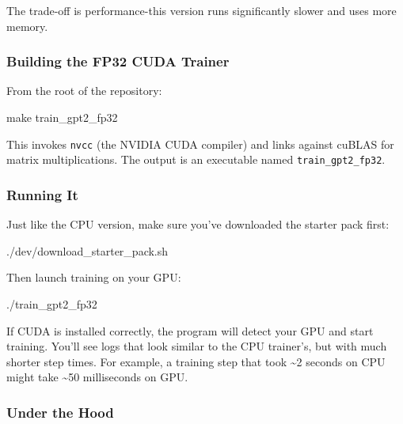 \documentclass[
  letterpaper,
  DIV=11,
  numbers=noendperiod]{scrreprt}
\newenvironment{Shaded}{\begin{snugshade}}{\end{snugshade}}
\newcommand{\ExtensionTok}[1]{\textcolor[rgb]{0.00,0.23,0.31}{#1}}
\newcommand{\FunctionTok}[1]{\textcolor[rgb]{0.28,0.35,0.67}{#1}}
\newcommand{\NormalTok}[1]{\textcolor[rgb]{0.00,0.23,0.31}{#1}}
\begin{document}
The trade-off is performance-this version runs significantly slower and
uses more memory.

\subsubsection{Building the FP32 CUDA
Trainer}\label{building-the-fp32-cuda-trainer}

From the root of the repository:

\begin{Shaded}
\begin{Highlighting}[]
\FunctionTok{make}\NormalTok{ train\_gpt2\_fp32}
\end{Highlighting}
\end{Shaded}

This invokes \texttt{nvcc} (the NVIDIA CUDA compiler) and links against
cuBLAS for matrix multiplications. The output is an executable named
\texttt{train\_gpt2\_fp32}.

\subsubsection{Running It}\label{running-it}

Just like the CPU version, make sure you've downloaded the starter pack
first:

\begin{Shaded}
\begin{Highlighting}[]
\ExtensionTok{./dev/download\_starter\_pack.sh}
\end{Highlighting}
\end{Shaded}

Then launch training on your GPU:

\begin{Shaded}
\begin{Highlighting}[]
\ExtensionTok{./train\_gpt2\_fp32}
\end{Highlighting}
\end{Shaded}

If CUDA is installed correctly, the program will detect your GPU and
start training. You'll see logs that look similar to the CPU trainer's,
but with much shorter step times. For example, a training step that took
\textasciitilde2 seconds on CPU might take \textasciitilde50
milliseconds on GPU.

\subsubsection{Under the Hood}\label{under-the-hood}
\end{document}
